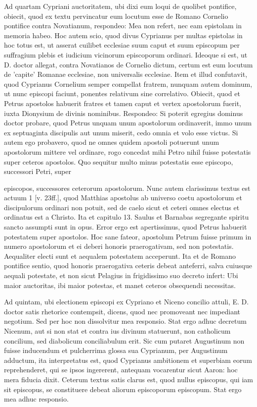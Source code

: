 Ad quartam Cypriani auctoritatem, ubi dixi eum loqui de quolibet pontifice, obiecit, quod ex textu pervincatur eum locutum esse de Romano Cornelio pontifice contra Novatianum, respondeo: Mea non refert, nec eam epistolam in memoria habeo. Hoc autem scio, quod divus Cyprianus per multas epistolas in hoc totus est, ut asserat cuilibet ecclesiae suum caput et suum episcopum per suffragium plebis et iudicium vicinorum episcoporum ordinari. Ideoque si est, ut D. doctor allegat, contra Novatianos de Cornelio dictum, certum est eum locutum de 'capite' Romanae ecclesiae, non universalis ecclesiae. Item et illud confutavit, quod Cyprianus Cornelium semper compellat fratrem, nunquam autem dominum, ut nunc episcopi faciunt, ponentes relativum sine correlativo. Obiecit, quod et Petrus apostolos habuerit fratres et tamen caput et vertex apostolorum fuerit, iuxta Dionysium de divinis nominibus. Respondeo: Si poterit egregius dominus doctor probare, quod Petrus unquam unum apostolorum ordinaverit, immo unum ex septuaginta discipulis aut unum miserit, cedo omnia et volo esse victus. Si autem ego probavero, quod ne omnes quidem apostoli potuerunt unum apostolorum mittere vel ordinare, rogo concedat mihi Petro nihil fuisse potestatis super ceteros apostolos. Quo sequitur multo minus potestatis esse episcopo, successori Petri, super \marginpar{\small[265]}

episcopos, successores ceterorum apostolorum. Nunc autem clarissimus textus est actuum 1 [v. 23ff.], quod Matthias apostolus ab universo coetu apostolorum et discipulorum ordinari non potuit, sed de caelo sicut et ceteri omnes electus et ordinatus est a Christo. Ita et capitulo 13. Saulus et Barnabas segregante spiritu sancto assumpti sunt in opus. Error ergo est apertissimus, quod Petrus habuerit potestatem super apostolos. Hoc sane fateor, apostolum Petrum fuisse primum in numero apostolorum et ei deberi honoris praerogativam, sed non potestatis. Aequaliter electi sunt et aequalem potestatem acceperunt. Ita et de Romano pontifice sentio, quod honoris praerogativa ceteris debeat anteferri, salva cuiusque aequali potestate, et non sicut Pelagius in frigidissimo suo decreto infert: Ubi maior auctoritas, ibi maior potestas, et manet ceteros obsequendi necessitas.

Ad quintam, ubi electionem episcopi ex Cypriano et Niceno concilio attuli, E. D. doctor satis rhetorice contempsit, dicens, quod nec promoveant nec impediant negotium. Sed per hoc non dissolvitur mea responsio. Stat ergo adhuc decretum Nicenum, aut si non stat et contra ius divinum statuerunt, non catholicum concilium, sed diabolicum conciliabulum erit. Sic cum putaret Augustinum non fuisse inducendum et pulcherrima glossa sua Cyprianum, per Augustinum adductum, ita interpretatus est, quod Cyprianus ambitionem et superbiam eorum reprehenderet, qui se ipsos ingererent, antequam vocarentur sicut Aaron: hoc mera fiducia dixit. Ceterum textus satis clarus est, quod nullus episcopus, qui iam sit episcopus, se constituere debeat aliorum episcoporum episcopum. Stat ergo mea adhuc responsio.

